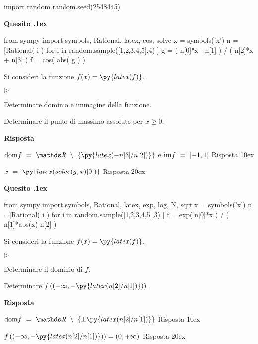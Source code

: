 \documentclass[11pt,twoside,a4paper]{article}
\newcommand{\mylabel}[1]{#1\hfill}
\renewenvironment{itemize}
  {\begin{list}{$\triangleright$}{%
   \setlength{\parskip}{0mm}
   \setlength{\topsep}{.4\baselineskip}
   \setlength{\rightmargin}{0mm}
   \setlength{\listparindent}{0mm}
   \setlength{\itemindent}{0mm}
   \setlength{\labelwidth}{2ex}
   \setlength{\itemsep}{.4\baselineskip}
   \setlength{\parsep}{0mm}
   \setlength{\partopsep}{0mm}
   \setlength{\labelsep}{1ex}
   \setlength{\leftmargin}{\labelwidth+\labelsep}
   \let\makelabel\mylabel}}{%
   \end{list}\vspace*{-1.3mm}}
\newcounter{quesito}
\newenvironment{question}{\bigskip\addtocounter{quesito}{1}\bigskip\bigskip\par\textbf{Quesito \thequesito.\kern1ex}}{\vspace{\parskip}}
\newenvironment{answer}{\par\textbf{Risposta\quad}}{\vspace{\parskip}}
\begin{document}
\begin{pycode}
import random
random.seed(2548445)
\end{pycode}

\begin{question}
\def\RR{{\mathds R}}
\def\dom{{\rm dom}}
\def\range{{\rm im}}
\begin{pycode}
from sympy import symbols, Rational, latex, cos, solve
x = symbols('x')
n =[Rational( i ) for i in random.sample([1,2,3,4,5],4) ]
g = ( n[0]*x - n[1] ) / ( n[2]*x + n[3] )
f = cos( abs( g ) )
\end{pycode}
Si consideri la funzione $\displaystyle f(x) = \py{latex(f)}$.
\begin{itemize}
\item[1.] Determinare dominio e immagine della funzione.
\item[2.] Determinare il punto di massimo assoluto per $x \geq 0$.
\end{itemize}
\begin{answer}

{\color{blue}
$\displaystyle \dom f \ =\ \RR\ \setminus\ \left\{\py{latex(-n[3]/n[2])}\right\} $
\quad e\quad 
$\range f \ =\ [-1, 1]$ 
\hfill Risposta 1\kern0ex}

{\color{blue}
$\displaystyle x\ =\ \py{latex(solve(g,x)[0])}$
\hfill Risposta 2\kern0ex}

\end{answer}
\end{question}
\begin{question}
\def\RR{{\mathds R}}
\def\dom{{\rm dom}}
\def\range{{\rm im}}
\begin{pycode}
from sympy import symbols, Rational, latex, exp, log, N, sqrt
x = symbols('x')
n =[Rational( i ) for i in random.sample([1,2,3,4,5],3) ]
f = exp( n[0]*x ) / ( n[1]*abs(x)-n[2] )
\end{pycode}
Si consideri la funzione $\displaystyle f(x) = \py{latex(f)} $.
\begin{itemize}
\item[1.] Determinare il dominio di $f$.
\item[2.] Determinare $\displaystyle f\left((-\infty, -\py{latex(n[2] / n[1])})\right)$.
\end{itemize}
\begin{answer}

{\color{blue}
$\displaystyle  \dom f \ =\ \RR\ \setminus\ \left\{\pm\py{latex(n[2] / n[1])}\right\} $ 
\hfill Risposta 1\kern0ex}

{\color{blue}
$\displaystyle f\left((-\infty, -\py{latex(n[2] / n[1])})\right) = (0, +\infty)$
\hfill Risposta 2\kern0ex}

\end{answer}
\end{question}
\end{document}
